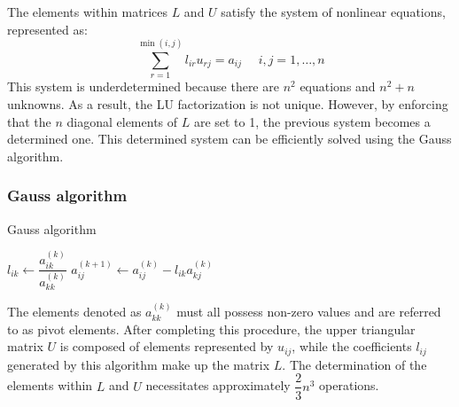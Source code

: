 The elements within matrices $L$ and $U$ satisfy the system of nonlinear equations, represented as:
\[\sum_{r=1}^{\min{(i,j)}}{l_{ir}u_{rj}}=a_{ij} \:\:\:\:\:\: i,j=1,\dots,n\]
This system is underdetermined because there are $n^2$ equations and $n^2+n$ unknowns.
As a result, the LU factorization is not unique. 
However, by enforcing that the $n$ diagonal elements of $L$ are set to 1, the previous system becomes a determined one.
This determined system can be efficiently solved using the Gauss algorithm.
\subsubsection*{Gauss algorithm}
\begin{algorithm}[H]
    \caption{Gauss algorithm}
        \begin{algorithmic}[1]
                    \State $l_{ik} \leftarrow \dfrac{a_{ik}^{(k)}}{a_{kk}^{(k)}}$
                        \State $a_{ij}^{(k+1)} \leftarrow a_{ij}^{(k)}-l_{ik}a_{kj}^{(k)}$
                    \EndFor
                \EndFor
            \EndFor
        \end{algorithmic}
\end{algorithm}
The elements denoted as $a_{kk}^{(k)}$ must all possess non-zero values and are referred to as pivot elements.
After completing this procedure, the upper triangular matrix $U$ is composed of elements represented by $u_{ij}$, while the coefficients $l_{ij}$ generated by this algorithm make up the matrix $L$.
The determination of the elements within $L$ and $U$ necessitates approximately $\dfrac{2}{3}n^3$ operations. 

